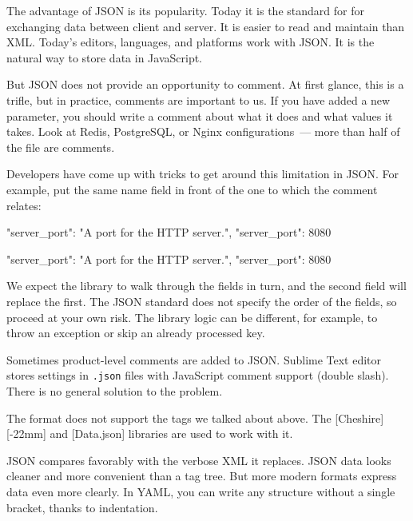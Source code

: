 The advantage of JSON is its popularity. Today it is the standard for for exchanging data between client and server.  It is easier to read and maintain than XML. Today's editors, languages, and platforms work with JSON. It is the natural way to store data in JavaScript.

But JSON does not provide an opportunity to comment. At first glance, this is a trifle, but in practice, comments are important to us. If you have added a new parameter, you should write a comment about what it does and what values it takes. Look at Redis, PostgreSQL, or Nginx configurations~--- more than half of the file are comments.

Developers have come up with tricks to get around this limitation in JSON.  For example, put the same name field in front of the one to which the comment relates:

\ifnarrow

\begin{json}
{
    "server_port":
    "A port for the HTTP server.",
    "server_port": 8080
}
\end{json}

\else

\begin{json}
{
    "server_port": "A port for the HTTP server.",
    "server_port": 8080
}
\end{json}

\fi

We expect the library to walk through the fields in turn, and the second field will replace the first. The JSON standard does not specify the order of the fields, so proceed at your own risk. The library logic can be different, for example, to throw an exception or skip an already processed key.

Sometimes product-level comments are added to JSON. Sublime Text editor stores settings in \verb|.json| files with JavaScript comment support (double slash). There is no general solution to the problem.


The format does not support the tags we talked about above. The [Cheshire][-22mm] and [Data.json] libraries are used to work with it.

JSON compares favorably with the verbose XML it replaces. JSON data looks cleaner and more convenient than a tag tree.  But more modern formats express data even more clearly. In YAML, you can write any structure without a single bracket, thanks to indentation.

